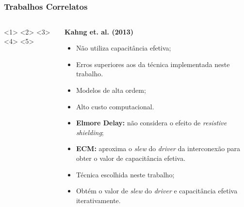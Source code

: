 \documentclass[10pt,a4paper]{beamer}
\begin{document}
		\subsection*{}
		\begin{frame}[t]
		\frametitle{Trabalhos Correlatos}
		
		\begin{columns}[t]
			\begin{column}{.6\linewidth}
	
	
				<1>
				<2>
				<3>
				<4>
				<5>
			\end{column}
			
			\begin{column}{.4\linewidth}
				\only<2>
				{
					\textbf{Kahng et. al. (2013)}
					\begin{itemize}
						\item Não utiliza capacitância efetiva;
						\item Erros superiores aos da técnica implementada neste trabalho.
					\end{itemize}
				}
				{
					\begin{itemize}
						\item Modelos de alta ordem;
						\item Alto custo computacional.
					\end{itemize}
				}
				{
					\begin{itemize}
						\item \textbf{Elmore Delay:} não considera o efeito de \textit{resistive shielding};
						\item \textbf{ECM:} aproxima o \textit{slew} do \textit{driver} da interconexão para obter o valor de capacitância efetiva.
					\end{itemize}
				}
				
				{
					\begin{itemize}
						\item Técnica escolhida neste trabalho;
						\item Obtém o valor de \textit{slew} do \textit{driver} e capacitância efetiva iterativamente.
					\end{itemize}
				}
			\end{column}
			
			
			
		\end{columns}
		
			
		\end{frame}
	
\end{document}
